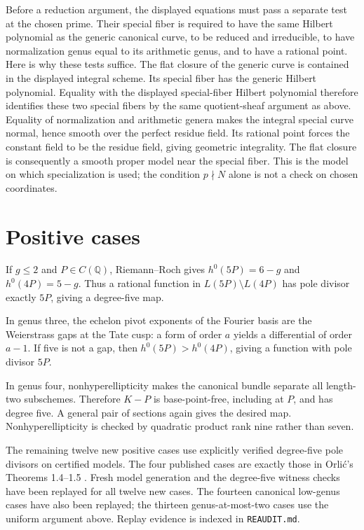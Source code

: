 \documentclass[11pt]{article}
\newcommand{\Q}{\mathbb Q}
\theoremstyle{remark}\newtheorem{remark}[theorem]{Remark}
\begin{document}
Before a reduction argument, the displayed equations must pass a separate
test at the chosen prime. Their special fiber is required to have the same
Hilbert polynomial as the generic canonical curve, to be reduced and
irreducible, to have normalization genus equal to its arithmetic genus,
and to have a rational point. Here is why these tests suffice. The flat
closure of the generic curve is contained in the displayed integral scheme.
Its special fiber has the generic Hilbert polynomial. Equality with the
displayed special-fiber Hilbert polynomial therefore identifies these two
special fibers by the same quotient-sheaf argument as above. Equality of
normalization and arithmetic genera makes the integral special curve
normal, hence smooth over the perfect residue field. Its rational point
forces the constant field to be the residue field, giving geometric
integrality. The flat closure is consequently a smooth proper model near
the special fiber. This is the model on which specialization is used;
the condition $p\nmid N$ alone is not a check on chosen coordinates.

\section{Positive cases}
If $g\le2$ and $P\in C(\Q)$, Riemann--Roch gives
$h^0(5P)=6-g$ and $h^0(4P)=5-g$. Thus a rational function in
$L(5P)\setminus L(4P)$ has pole divisor exactly $5P$, giving a
degree-five map.

In genus three, the echelon pivot exponents of the Fourier basis are
the Weierstrass gaps at the Tate cusp: a form of order $a$ yields a
differential of order $a-1$. If five is not a gap, then
$h^0(5P)>h^0(4P)$, giving a function with pole divisor $5P$.

In genus four, nonhyperellipticity makes the canonical bundle separate
all length-two subschemes. Therefore $K-P$ is base-point-free, including
at $P$, and has degree five. A general pair of sections again gives
the desired map. Nonhyperellipticity is checked by quadratic product
rank nine rather than seven.

The remaining twelve new positive cases use explicitly verified degree-five
pole divisors on certified models. The four published cases are exactly
those in Orli\'c's Theorems 1.4--1.5 \cite{Orlic}.
Fresh model generation and the degree-five witness checks have been replayed
for all twelve new cases. The fourteen canonical low-genus cases have also
been replayed; the thirteen genus-at-most-two cases use the uniform argument
above. Replay evidence is indexed in \texttt{REAUDIT.md}.
\end{document}
